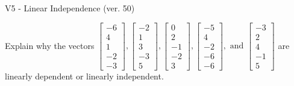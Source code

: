 \begin{exercise}
  \begin{exerciseTitle}V5 - Linear Independence (ver. 50)\end{exerciseTitle}
  \begin{exerciseStatement}
    Explain why the vectors \(\left[\begin{array}{r}
-6 \\
4 \\
1 \\
-2 \\
-3
\end{array}\right] , \left[\begin{array}{r}
-2 \\
1 \\
3 \\
-3 \\
5
\end{array}\right] , \left[\begin{array}{r}
0 \\
2 \\
-1 \\
-2 \\
3
\end{array}\right] , \left[\begin{array}{r}
-5 \\
4 \\
-2 \\
-6 \\
-6
\end{array}\right] , \text{ and } \left[\begin{array}{r}
-3 \\
2 \\
4 \\
-1 \\
5
\end{array}\right]\) are linearly dependent or linearly independent.	



\end{exerciseStatement}
\end{exercise}
